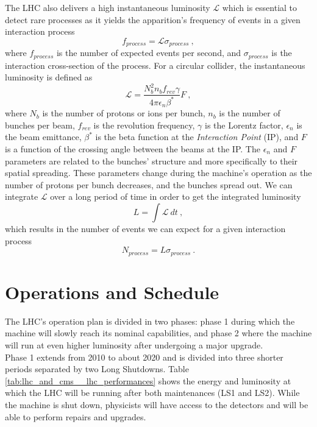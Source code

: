   	The LHC also delivers a high instantaneous luminosity $ \mathcal{L} $ which is essential to detect rare processes as it yields the apparition's frequency of events in a given interaction process
  	\begin{equation}
  		f_{process} = \mathcal{L} \sigma_{process} \ ,
  	\end{equation}
  	where $ f_{process} $ is the number of expected events per second, and $ \sigma_{process} $ is the interaction cross-section of the process. For a circular collider, the instantaneous luminosity is defined as
  	\begin{equation}
  		\mathcal{L} = \frac{N^2_b n_b f_{rev} \gamma}{4 \pi \epsilon_n \beta^*} F \ ,
  		\label{eq:lhc_and_cms__luminosity}
  	\end{equation}
  	where $ N_b $ is the number of protons or ions per bunch, $ n_b $ is the number of bunches per beam, $ f_{rev} $ is the revolution frequency, $ \gamma $ is the Lorentz factor, $ \epsilon_n $ is the beam emittance, $ \beta^* $ is the beta function at the \emph{Interaction Point} (IP), and $ F $ is a function of the crossing angle between the beams at the IP. The $ \epsilon_n $ and $ F $ parameters are related to the bunches' structure and more specifically to their spatial spreading. These parameters change during the machine's operation as the number of protons per bunch decreases, and the bunches spread out. We can integrate $ \mathcal{L} $ over a long period of time in order to get the integrated luminosity
  	\begin{equation}
  		L = \int \mathcal{L} \ dt \ ,
  	\end{equation}
  	which results in the number of events we can expect for a given interaction process
  	\begin{equation}
  		N_{process} = L \sigma_{process} \ .
  		\label{eq:lhc_and_cms__luminosity_to_N}
  	\end{equation}

	\section{Operations and Schedule}

		The LHC's operation plan \Cite{CMS_Upgrades} is divided in two phases: phase 1 during which the machine will slowly reach its nominal capabilities, and phase 2 where the machine will run at even higher luminosity after undergoing a major upgrade. \\

		Phase 1 extends from 2010 to about 2020 and is divided into three shorter periods separated by two Long Shutdowns. Table \ref{tab:lhc_and_cms__lhc_performances} shows the energy and luminosity at which the LHC will be running after both maintenances (LS1 and LS2). While the machine is shut down, physicists will have access to the detectors and will be able to perform repairs and upgrades. \\

